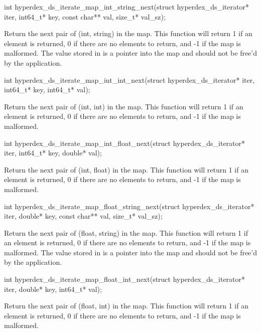 \funcsep
\begin{ccode}
int hyperdex_ds_iterate_map_int_string_next(struct hyperdex_ds_iterator* iter,
                                            int64_t* key,
                                            const char** val, size_t* val_sz);
\end{ccode}
\funcdesc Return the next pair of (int, string) in the map.  This function will
return 1 if an element is returned, 0 if there are no elements to return, and -1
if the map is malformed.  The value stored in  is a pointer into the
map and should not be free'd by the application.

\funcsep
\begin{ccode}
int hyperdex_ds_iterate_map_int_int_next(struct hyperdex_ds_iterator* iter,
                                         int64_t* key, int64_t* val);
\end{ccode}
\funcdesc Return the next pair of (int, int) in the map.  This function will
return 1 if an element is returned, 0 if there are no elements to return, and -1
if the map is malformed.

\funcsep
\begin{ccode}
int hyperdex_ds_iterate_map_int_float_next(struct hyperdex_ds_iterator* iter,
                                           int64_t* key, double* val);
\end{ccode}
\funcdesc Return the next pair of (int, float) in the map.  This function will
return 1 if an element is returned, 0 if there are no elements to return, and -1
if the map is malformed.

\funcsep
\begin{ccode}
int hyperdex_ds_iterate_map_float_string_next(struct hyperdex_ds_iterator* iter,
                                              double* key,
                                              const char** val, size_t* val_sz);
\end{ccode}
\funcdesc Return the next pair of (float, string) in the map.  This function
will return 1 if an element is returned, 0 if there are no elements to return,
and -1 if the map is malformed.  The value stored in  is a pointer
into the map and should not be free'd by the application.

\funcsep
\begin{ccode}
int hyperdex_ds_iterate_map_float_int_next(struct hyperdex_ds_iterator* iter,
                                           double* key, int64_t* val);
\end{ccode}
\funcdesc Return the next pair of (float, int) in the map.  This function will
return 1 if an element is returned, 0 if there are no elements to return, and -1
if the map is malformed.

